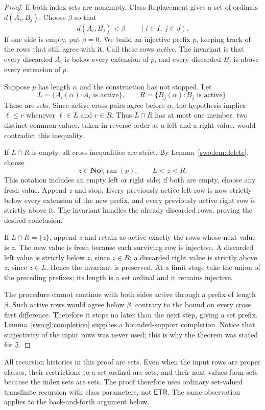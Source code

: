 \documentclass[11pt]{article}
\theoremstyle{definition}
\theoremstyle{remark}
\newcommand{\No}{\mathbf{No}}
\newcommand{\Jinj}{\mathfrak J}
\newcommand{\ran}{\operatorname{ran}}
\newcommand{\ETR}{\mathsf{ETR}}
\begin{document}
\begin{proof}
If both index sets are nonempty, Class Replacement gives a set of ordinals
$d(A_i,B_j)$.  Choose $\beta$ so that
\[
 d(A_i,B_j)<\beta\qquad(i\in I,\ j\in J).
\]
If one side is empty, put $\beta=0$.  We build an injective prefix $p$, keeping
track of the rows that still agree with it.  Call these rows \emph{active}.
The invariant is that every discarded $A_i$ is below every extension of $p$,
and every discarded $B_j$ is above every extension of $p$.

Suppose $p$ has length $\alpha$ and the construction has not stopped.  Let
\[
 L=\{A_i(\alpha):A_i\text{ is active}\},\qquad
 R=\{B_j(\alpha):B_j\text{ is active}\}.
\]
These are sets.  Since active cross pairs agree before $\alpha$, the hypothesis
implies $\ell\le r$ whenever $\ell\in L$ and $r\in R$.  Thus $L\cap R$
has at most one member: two distinct common values, taken in reverse order
as a left and a right value, would contradict this inequality.

If $L\cap R$ is empty, all cross inequalities are strict.  By
Lemma~\ref{swo:lem:delete}, choose
\[
 z\in\No\setminus\ran(p),\qquad L<z<R.
\]
This notation includes an empty left or right side; if both are empty, choose
any fresh value.  Append $z$ and stop.  Every previously active left row is
now strictly below every extension of the new prefix, and every previously
active right row is strictly above it.  The invariant handles the already
discarded rows, proving the desired conclusion.

If $L\cap R=\{z\}$, append $z$ and retain as active exactly the rows whose
next value is $z$.  The new value is fresh because each surviving row is
injective.  A discarded left value is strictly below $z$, since $z\in R$;
a discarded right value is strictly above $z$, since $z\in L$.  Hence the
invariant is preserved.  At a limit stage take the union of the preceding
prefixes; its length is a set ordinal and it remains injective.

The procedure cannot continue with both sides active through a prefix of
length $\beta$.  Such active rows would agree below $\beta$, contrary to the
bound on every cross first difference.  Therefore it stops no later than the
next step, giving a set prefix.  Lemma~\ref{swo:gl:completion} supplies a
bounded-support completion.  Notice that surjectivity of the input rows was
never used; this is why the theorem was stated for $\Jinj$.
\end{proof}

All recursion histories in this proof are sets.  Even when the input rows are
proper classes, their restrictions to a set ordinal are sets, and their next
values form sets because the index sets are sets.  The proof therefore uses
ordinary set-valued transfinite recursion with class parameters, not $\ETR$.
The same observation applies to the back-and-forth argument below.
\end{document}
